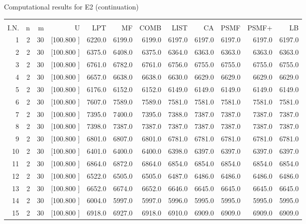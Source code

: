 \documentclass[12pt,a4paper]{article}
\begin{document}
\newpage
\begin{center}
 Computational results for E2 (continuation) {\tiny
\begin{tabular}{r r r r r r r r r r r r}\hline
    &   &   &          &        &        &        &        &        &        &        &       \\[-0.1in]
  I.N.  &  n  &  m  &  U  &  LPT  &  MF  &  COMB  &  LIST  &  CA  & PSMF &PSMF+ & LB \\[0.03in]
\hline
   1&  2& 30&[100.800   ]&  6220.0&  6199.0&  6199.0&  6197.0&  6197.0&  6197.0&  6197.0&  6197.0\\[-0.02in]
   2&  2& 30&[100.800   ]&  6375.0&  6408.0&  6375.0&  6364.0&  6363.0&  6363.0&  6363.0&  6363.0\\[-0.02in]
   3&  2& 30&[100.800   ]&  6761.0&  6782.0&  6761.0&  6756.0&  6755.0&  6755.0&  6755.0&  6755.0\\[-0.02in]
   4&  2& 30&[100.800   ]&  6657.0&  6638.0&  6638.0&  6630.0&  6629.0&  6629.0&  6629.0&  6629.0\\[-0.02in]
   5&  2& 30&[100.800   ]&  6176.0&  6152.0&  6152.0&  6149.0&  6149.0&  6149.0&  6149.0&  6149.0\\[-0.02in]
   6&  2& 30&[100.800   ]&  7607.0&  7589.0&  7589.0&  7581.0&  7581.0&  7581.0&  7581.0&  7581.0\\[-0.02in]
   7&  2& 30&[100.800   ]&  7395.0&  7400.0&  7395.0&  7388.0&  7387.0&  7387.0&  7387.0&  7387.0\\[-0.02in]
   8&  2& 30&[100.800   ]&  7398.0&  7387.0&  7387.0&  7387.0&  7387.0&  7387.0&  7387.0&  7387.0\\[-0.02in]
   9&  2& 30&[100.800   ]&  6801.0&  6807.0&  6801.0&  6781.0&  6781.0&  6781.0&  6781.0&  6781.0\\[-0.02in]
  10&  2& 30&[100.800   ]&  6401.0&  6400.0&  6400.0&  6398.0&  6397.0&  6397.0&  6397.0&  6397.0\\[-0.02in]
  11&  2& 30&[100.800   ]&  6864.0&  6872.0&  6864.0&  6854.0&  6854.0&  6854.0&  6854.0&  6854.0\\[-0.02in]
  12&  2& 30&[100.800   ]&  6522.0&  6505.0&  6505.0&  6487.0&  6486.0&  6486.0&  6486.0&  6486.0\\[-0.02in]
  13&  2& 30&[100.800   ]&  6652.0&  6674.0&  6652.0&  6646.0&  6645.0&  6645.0&  6645.0&  6645.0\\[-0.02in]
  14&  2& 30&[100.800   ]&  6004.0&  5997.0&  5997.0&  5996.0&  5995.0&  5995.0&  5995.0&  5995.0\\[-0.02in]
  15&  2& 30&[100.800   ]&  6918.0&  6927.0&  6918.0&  6910.0&  6909.0&  6909.0&  6909.0&  6909.0\\[-0.02in]

\end{tabular}}
\end{center}
\end{document}
